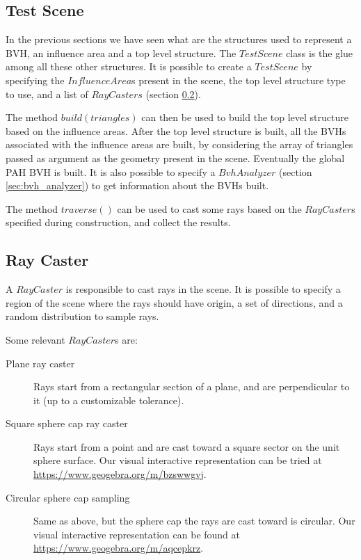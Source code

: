 \documentclass{PoliMi_MasterThesis}
\begin{document}
\subsection{Test Scene}
In the previous sections we have seen what are the structures used to represent a BVH, an influence area and a top level structure. The $TestScene$ class is the glue among all these other structures. It is possible to create a $TestScene$ by specifying the $InfluenceArea$s present in the scene, the top level structure type to use, and a list of $RayCasters$ (section \ref{ssec:ray_caster}).

The method $build(triangles)$ can then be used to build the top level structure based on the influence areas. After the top level structure is built, all the BVHs associated with the influence areas are built, by considering the array of triangles passed as argument as the geometry present in the scene. Eventually the global PAH BVH is built. It is also possible to specify a $BvhAnalyzer$ (section \ref{sec:bvh_analyzer}) to get information about the BVHs built.

The method $traverse()$ can be used to cast some rays based on the $RayCaster$s specified during construction, and collect the results.

\subsection{Ray Caster} \label{ssec:ray_caster}
A $RayCaster$ is responsible to cast rays in the scene. It is possible to specify a region of the scene where the rays should have origin, a set of directions, and a random distribution to sample rays.

Some relevant $RayCaster$s are:
\begin{description}
	\item[Plane ray caster] Rays start from a rectangular section of a plane, and are perpendicular to it (up to a customizable tolerance).
	\item[Square sphere cap ray caster] Rays start from a point and are cast toward a square sector on the unit sphere surface. Our visual interactive representation can be tried at \url{https://www.geogebra.org/m/bzswwgvj}.
	\item[Circular sphere cap sampling] Same as above, but the sphere cap the rays are cast toward is circular. Our visual interactive representation can be found at \url{https://www.geogebra.org/m/aqcepkrz}.
\end{description}
\end{document}
